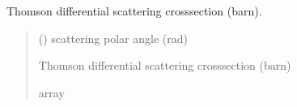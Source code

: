 \documentclass[letterpaper,10pt,english,openany,oneside]{sphinxmanual}
\begin{document}
\begin{fulllineitems}
\label{\detokenize{api/unpolarized:dxraylib.DCS_Thoms}}
\pysigstartsignatures
{}
\pysigstopsignatures
\sphinxAtStartPar
Thomson differential scattering cross\sphinxhyphen{}section (barn).
\begin{quote}\begin{description}
\sphinxAtStartPar
{} () \textendash{} scattering polar angle (rad)

\sphinxAtStartPar
Thomson differential scattering cross\sphinxhyphen{}section (barn)

\sphinxAtStartPar
array

\end{description}\end{quote}

\end{fulllineitems}


\begin{DUlineblock}{0em}
\item[] 
\end{DUlineblock}
\end{document}
